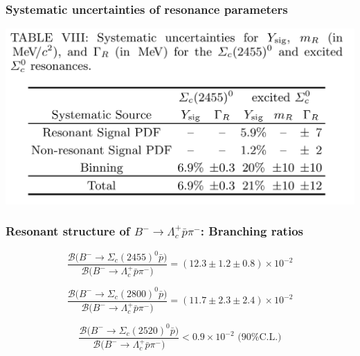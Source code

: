 \documentclass[10pt, aspectratio=169]{beamer}
\begin{document}
\begin{frame}[label=res-syst]%
  \frametitle{Systematic uncertainties of resonance parameters}
  \centering
  \includegraphics[width=.7\textwidth]{figures/002/table-syst-resonances}
\end{frame}%

\begin{frame}[label=res-BRs]%
  \frametitle{Resonant structure of $B^- \to \Lambda_c^+\bar{p}\pi^-$: Branching ratios}
  \Large

  $$ \frac{\mathcal{B}\big(B^- \to \Sigma_c(2455)^0 \bar{p} \big)}
  {\mathcal{B}\big(B^- \to \Lambda_c^+ \bar{p} \pi^- \big)}
  = \left(12.3 \pm 1.2 \pm 0.8 \right) \times 10^{-2}$$

  $$ \frac{\mathcal{B}\big(B^- \to \Sigma_c(2800)^0 \bar{p} \big)}
  {\mathcal{B}\big(B^- \to \Lambda_c^+ \bar{p} \pi^- \big)}
  = \left(11.7 \pm 2.3 \pm 2.4 \right) \times 10^{-2}$$

  $$ \frac{\mathcal{B}\big(B^- \to \Sigma_c(2520)^0 \bar{p} \big)}
  {\mathcal{B}\big(B^- \to \Lambda_c^+ \bar{p} \pi^- \big)}
  < 0.9 \times 10^{-2} \text{ (90\% C.L.)}$$
\end{frame}%
\end{document}
